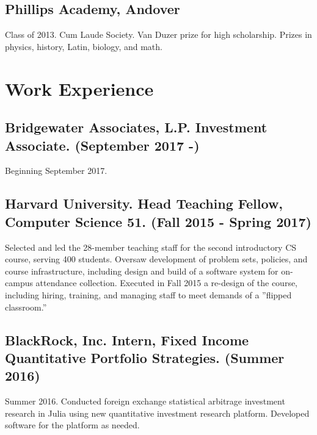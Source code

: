 \documentclass[letterpaper]{amsart}
\renewenvironment{itemize}{
  \begin{list}{}{
    \setlength{\leftmargin}{1.5em}
  }
}{
  \end{list}
}
\begin{document}
\subsection*{Phillips Academy, Andover}
\begin{itemize}
  \item Class of 2013. Cum Laude Society. Van Duzer prize for high scholarship. Prizes in physics, history, Latin, biology, and math.  
\end{itemize}

\section*{Work Experience}

\subsection*{Bridgewater Associates, L.P. Investment Associate. (September 2017 -) }
\begin{itemize}
\item Beginning September 2017.
\end{itemize}

\subsection*{Harvard University. Head Teaching Fellow, Computer Science 51. (Fall 2015 - Spring 2017)}
\begin{itemize}
\item
Selected and led the 28-member teaching staff for the second introductory CS course, serving 400 students. Oversaw
development of problem sets, policies, and course infrastructure, including design and build of a software
system for on-campus attendance collection. Executed in Fall 2015 a re-design of the course,
including hiring, training, and managing staff to meet demands of a ''flipped classroom.''
\end{itemize}

\subsection*{BlackRock, Inc. Intern, Fixed Income Quantitative Portfolio Strategies. (Summer 2016)} 
\begin{itemize}
\item Summer 2016. Conducted foreign exchange statistical arbitrage investment research in Julia using new quantitative investment research platform. Developed software for the platform as needed. 
\end{itemize}
\end{document}
